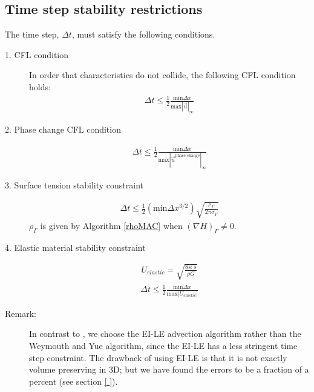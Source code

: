 \documentclass[]{article}
\begin{document}
\subsection{Time step stability restrictions \label{cflsection} }

The time step, $\Delta t$, must satisfy the following 
conditions\cite{ye2024improved,li2015multiphase}.  
\begin{description}
\item[1. CFL condition] In order that characteristics do not 
 collide, the following CFL condition holds:
 \begin{eqnarray*}
 \Delta t\le 
  \frac{1}{2}\frac{\mbox{min}\Delta x}{\mbox{max}|\vec{u}|_{\infty}} 
 \end{eqnarray*}
\item[2. Phase change CFL condition]
 \begin{eqnarray*}
 \Delta t\le 
  \frac{1}{2}\frac{\mbox{min}\Delta x}{\mbox{max}
   |\vec{u}^{\mbox{phase change}}|_{\infty}} 
 \end{eqnarray*}
\item[3. Surface tension stability constraint] 
 \begin{eqnarray*}
 \Delta t\le\frac{1}{2}(\mbox{min} \Delta x^{3/2}) 
   \sqrt{\frac{\rho_{\Gamma}}{2\pi\sigma_{\Gamma}}}
 \end{eqnarray*}
 $\rho_{\Gamma}$ is given by Algorithm \ref{rhoMAC} when 
 $(\nabla H)_{\Gamma}\ne 0$.
\item[4. Elastic material stability constraint]
 \begin{eqnarray*}
 U_{elastic}=\sqrt{\frac{8 s : s}{\rho G}}
 \end{eqnarray*}
 \begin{eqnarray*}
 \Delta t\le 
  \frac{1}{2}\frac{\mbox{min}\Delta x}{\mbox{max}|U_{elastic}|}
 \end{eqnarray*}
\end{description}
Remark:
\begin{description}
\item[]
In contrast to \cite{ye2024improved}, we choose the
EI-LE advection 
algorithm\cite{jemison2014compressible,scardovelli2003interface} rather 
than the Weymouth and Yue algorithm\cite{weymouth2010conservative},
since the EI-LE has a less stringent time step constraint.  The
drawback of using EI-LE is that it is not exactly
volume preserving in 3D; but we have found the errors to be a
fraction of a percent (see section \ref{ }).
\end{description}
\end{document}

